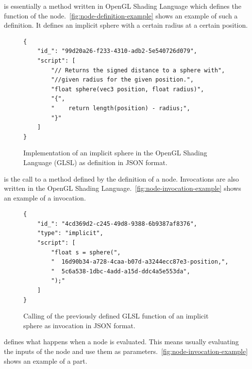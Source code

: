 \documentclass[%
    a4paper,    %
    justified,  %
    nobib,      %
    openany     %
]{tufte-book}
\makeatletter
\renewcommand{\label}[1]{\@tufte@label{##1}}%
\makeatother
\begin{document}
 is essentially a method written in OpenGL
Shading Language which defines the function of the
node.~\cref{fig:node-definition-example} shows an example of such a definition.
It defines an implicit sphere with a certain radius at a certain position.

\begin{figure}[!htbp]
  \begin{verbatim}
{
    "id_": "99d20a26-f233-4310-adb2-5e540726d079",
    "script": [
        "// Returns the signed distance to a sphere with",
        "//given radius for the given position.",
        "float sphere(vec3 position, float radius)",
        "{",
        "    return length(position) - radius;",
        "}"
    ]
}
  \end{verbatim}
\caption{Implementation of an implicit sphere in the OpenGL Shading Language
  (GLSL) as definition in JSON format.}
\label{fig:node-definition-example}
\end{figure}

\newpage{}

 is the call to a method defined by
the definition of a node. Invocations are also written in the OpenGL Shading
Language.~\cref{fig:node-invocation-example} shows an example of a invocation.

\begin{figure}[!htbp]
  \begin{verbatim}
{
    "id_": "4cd369d2-c245-49d8-9388-6b9387af8376",
    "type": "implicit",
    "script": [
        "float s = sphere(",
        "  16d90b34-a728-4caa-b07d-a3244ecc87e3-position,",
        "  5c6a538-1dbc-4add-a15d-ddc4a5e553da",
        ");"
    ]
}
  \end{verbatim}
\caption{Calling of the previously defined GLSL function of an implicit sphere
  as invocation in JSON format.}
\label{fig:node-invocation-example}
\end{figure}

 defines what happens when a node is
evaluated. This means usually evaluating the inputs of the node and use them as
parameters.~\cref{fig:node-invocation-example} shows an example of a part.
\end{document}
